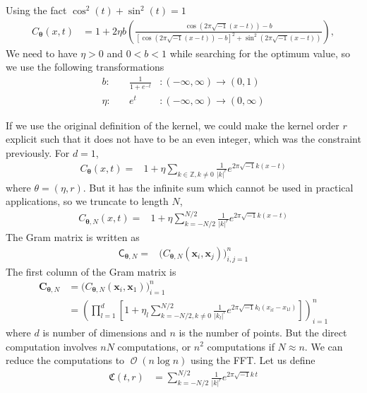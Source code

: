 \documentclass{iitthesis}          %
\DeclareMathOperator{\Order}{{\mathcal O}}
\newcommand{\bm}[1]{\boldsymbol{#1}}
\newcommand{\vtheta}{{\bm{\theta}}}
\newcommand{\vC}{\bm{C}}
\newcommand{\vx}{\bm{x}}
\newcommand{\mC}{\mathsf{C}}
\def\abs#1{\ensuremath{\left \lvert #1 \right \rvert}}
\begin{document}
Using the fact $\cos^2(t) + \sin^2(t) = 1$
\begin{align*}
C_\vtheta(x, t) &= 
1 + 2 \eta b
\left(
\frac{ \cos({2 \pi\sqrt{-1} (x-t) }) - b }
{ \left[\cos({ 2 \pi\sqrt{-1} (x-t)})-b\right]^2 + \sin^2({ 2 \pi\sqrt{-1} (x-t)}) }
\right),
\end{align*}
We need to have $\eta > 0$ and $ 0 < b < 1$ while searching for the optimum value, so we use the following transformations
\begin{align*}
b: & \quad \frac{1}{1 + e^{-t}} & :(-\infty, \infty) \to (0, 1)
\\
\eta: & \quad e^{t} & :(-\infty, \infty) \to (0, \infty)
\end{align*}


\label{sec:trunc_series_kernel}
If we use the original definition of the kernel, we could make the kernel order $r$ explicit such that it does not have to be an even integer, which was the constraint previously. For $d=1$,
\begin{align*}
C_\vtheta(x, t) = & 1 + \eta \sum_{k \in \mathbb{Z}, k \neq 0 } \frac{1}{\abs{k}^r} 
e^{ 2 \pi\sqrt{-1} k (x-t)}
\end{align*}
where $\theta = (\eta, r)$. 
But it has the infinite sum which cannot be used in practical applications, so we truncate to length $N$,
\begin{align*}
C_{\vtheta, N}(x, t) = & 1 + \eta \sum_{k = - N/2 }^{N/2} \frac{1}{\abs{k}^r} 
e^{ 2 \pi\sqrt{-1} k (x-t)}
\end{align*}
The Gram matrix is written as 
\begin{align*}
\mC_{\vtheta, N} = & \biggl( C_{\vtheta, N}(\vx_i, \vx_j) \biggr)_{i,j=1}^n
\end{align*}
The first column of the Gram matrix is
\begin{align*}
\vC_{\vtheta, N} &= \biggl( C_{\vtheta, N}(\vx_i, \vx_1) \biggr)_{i=1}^n
\\
&= \left( \prod_{l=1}^d \left[ 1 + \eta_l \sum_{k = - N/2, k \neq 0 }^{N/2} \frac{1}{\abs{k_l}^r} 
e^{ 2 \pi\sqrt{-1} k_l (x_{il}-x_{1l})}\right] \right)_{i=1}^n
\end{align*}
where $d$ is number of dimensions and $n$ is the number of points. 
But the direct computation involves $nN$ computations, or $n^2$ computations if $N \approx n$. We can reduce the computations to $\Order(n\log n)$ using the FFT.
Let us define
\begin{align*}
\mathfrak{C}(t, r) &= \sum_{k = - N/2 }^{N/2} \frac{1}{\abs{k}^r} 
e^{ 2 \pi\sqrt{-1} k\, t}
\end{align*}
\end{document}
